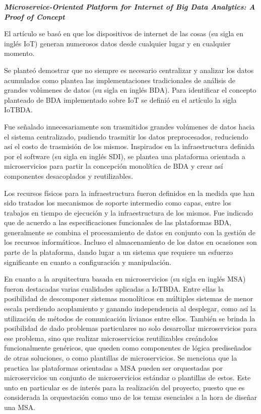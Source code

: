 

\textbf{
    \emph{ Microservice-Oriented Platform for Internet of Big Data Analytics: A Proof of Concept }
} \cite{li_microservice-oriented_2019}

El artículo se basó en que los dispositivos de internet de las cosas (su sigla en inglés IoT) generan numerosos datos desde cualquier lugar y en cualquier momento.

Se planteó demostrar que no siempre es necesario centralizar y analizar los datos acumulados como plantea las implementaciones tradicionales de análisis de grandes volúmenes de datos (su sigla en inglés BDA). Para identificar el concepto planteado de BDA implementado sobre IoT se definió en el artículo la sigla IoTBDA.

Fue señalado innecesariamente son trasmitidos grandes volúmenes de datos hacia el sistema centralizado, pudiendo trasmitir los datos preprocesados, reduciendo así el costo de trasmisión de los mismos. 
Inspirados en la infraestructura definida por el software (su sigla en inglés SDI), se plantea una plataforma orientada a microservicios para partir la concepción monolítica de BDA y crear así componentes desacoplados y reutilizables.

Los recursos físicos para la infraestructura fueron definidos en la medida que han sido tratados los mecanismos de soporte intermedio como capas, entre los trabajos en tiempo de ejecución y la infraestructura de los mismos.
Fue indicado que  de acuerdo a las especificaciones funcionales de las plataformas BDA, generalmente se combina el procesamiento de datos en conjunto con la gestión de los recursos informáticos. Incluso el almacenamiento de los datos en ocasiones son parte de la plataforma, dando lugar a un sistema que requiere un esfuerzo significante en cuanto a configuración y manipulación.

En cuanto a la arquitectura basada en microservicios (su sigla en inglés MSA) fueron destacadas varias cualidades aplicadas a IoTBDA. Entre ellas la posibilidad de descomponer sistemas monolíticos en múltiples sistemas de menor escala perdiendo acoplamiento y ganando independencia al desplegar, como así la utilización de métodos de comunicación livianos entre ellos. También se brinda la posibilidad de dado problemas particulares no solo desarrollar microservicios para ese problema, sino que realizar microservicios reutilizables creándolos funcionalmente genéricos, que queden como componentes de lógica prediseñados de otras soluciones, o como plantillas de microservicios. Se menciona que la practica las plataformas orientadas a MSA pueden ser orquestadas por microservicios un conjunto de microservicios estándar o plantillas de estos. Este unto en particular es de interés para la realización del proyecto, puesto que es considerada la orquestación como uno de los temas esenciales  a  la hora de diseñar una MSA. 

